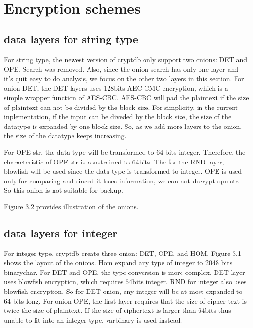 \section{Encryption schemes}


\subsection{data layers for string type}

For string type, the newest version of cryptdb only support two onions: DET and OPE. Search was removed. Also, since the onion search has only one layer and it's quit easy to do analysis, we focus on the other two layers
in this section. For onion DET, the DET layers uses 128bits AEC-CMC encryption, which is a simple wrapper function of AES-CBC. AES-CBC will pad the plaintext if the size of plaintext can not be divided by the block size. For simplicity, in the current inplementation, if the input can be diveded by the block size, the size of the datatype is expanded by one block size. So, as we add more layers to the onion, the size of the datatype keeps increasing. 

For OPE-str, the data type will be transformed to 64 bits integer. Therefore, the characteristic of OPE-str is constrained to 64bits. The for the RND layer, blowfish will be used since the data type is transformed to integer. OPE is used only for comparing and sinced it loses information, we can not decrypt ope-str. So this onion is not suitable for backup. 

Figure 3.2 provides illustration of the onions. 



\subsection{data layers for integer}

For integer type, cryptdb create three onion: DET, OPE, and HOM. Figure 3.1 shows the layout of the onions. Hom expand any type of integer to 2048 bits binarychar. For DET and OPE, the type conversion is more complex. DET layer uses blowfish encryption, which requires 64bits integer. RND for integer also uses blowfish encryption. So for DET onion, any integer will be at most expanded to 64 bits long. For onion OPE, the first layer requires that the size of cipher text is twice the size of plaintext. If the size of ciphertext is larger than 64bits thus unable to fit into an integer type, varbinary is used instead. 



